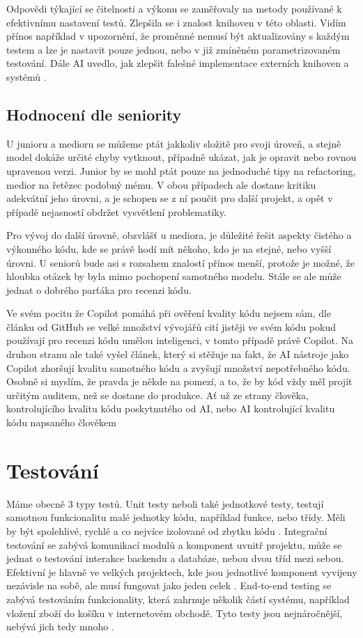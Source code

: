 \documentclass[FM,DP]{tulthesis}
\begin{document}
		Odpovědi týkající se čitelnosti a výkonu se zaměřovaly na metody používané k efektivnímu nastavení testů. Zlepšila se i znalost knihoven v této oblasti. Vidím přínos například v upozornění, že proměnné nemusí být aktualizovány s každým testem a lze je nastavit pouze jednou, nebo v již zmíněném parametrizovaném testování. Dále AI uvedlo, jak zlepšit falešné implementace externích knihoven a systémů \cite{parametrized_testing_fe} \cite{testing}.
		
		
		\subsection{Hodnocení dle seniority}
		U junioru a medioru se můžeme ptát jakkoliv složitě pro svoji úroveň, a stejně model dokáže určité chyby vytknout, případně ukázat, jak je opravit nebo rovnou upravenou verzi. Junior by se mohl ptát pouze na jednoduché tipy na refactoring, medior na řetězec podobný mému. V obou případech ale dostane kritiku adekvátní jeho úrovni, a je schopen se z ní poučit pro další projekt, a opět v případě nejasností obdržet vysvětlení problematiky. 
		
		Pro vývoj do další úrovně, obzvlášť u mediora, je důležité řešit aspekty čistého a výkonného kódu, kde se právě hodí mít někoho, kdo je na stejné, nebo vyšší úrovni. U seniorů bude asi s rozsahem znalostí přínos menší, protože je možné, že hloubka otázek by byla mimo pochopení samotného modelu. Stále se ale může jednat o dobrého parťáka pro recenzi kódu.
		
		Ve svém pocitu že Copilot pomáhá při ověření kvality kódu nejsem sám, dle článku od GitHub se velké množství vývojářů cití jistěji ve svém kódu pokud používají pro recenzi kódu umělou inteligenci, v tomto případě právě Copilot. Na druhou stranu ale také vyšel článek, který si stěžuje na fakt, že AI nástroje jako Copilot zhoršují kvalitu samotného kódu a zvyšují množství nepotřebného kódu. Osobně si myslím, že pravda je někde na pomezí, a to, že by kód vždy měl projít určitým auditem, než se dostane do produkce. Ať už ze strany člověka, kontrolujícího kvalitu kódu poskytnutého od AI, nebo AI kontrolující kvalitu kódu napsaného člověkem \cite{copilot:code_churn} \cite{copilot:benefits}
		
		
		\section{Testování}
		Máme obecně 3 typy testů. Unit testy neboli také jednotkové testy, testují samotnou funkcionalitu malé jednotky kódu, například funkce, nebo třídy. Měli by být spolehlivé, rychlé a co nejvíce izolované od zbytku kódu \cite{testing}. Integrační testování se zabývá komunikací modulů a komponent uvnitř projektu, může se jednat o testování interakce backendu a databáze, nebou dvou tříd mezi sebou. Efektivní je hlavně ve velkých projektech, kde jsou jednotlivé komponent vyvijeny nezávisle na sobě, ale musí fungovat jako jeden celek \cite{testing}. End-to-end testing se zabývá testováním funkcionality, která zahrnuje několik částí systému, například vložení zboží do košíku v internetovém obchodě. Tyto testy jsou nejnáročnější, nebývá jich tedy mnoho \cite{testing}.
		
\end{document}
